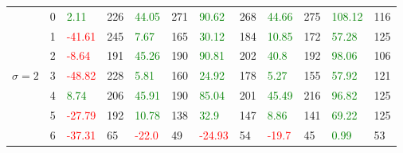 \begin{table}[!htb]
\begin{adjustwidth}{-0.8in}{-0.9in}
\begin{tabular}{|p{4em}|p{2em}|p{3em}|p{3em}|p{3em}|p{3em}|p{3em}|p{3em}|p{3em}|p{3em}|p{3em}|p{3em}|}
            & 0 & \textcolor{green}{2.11} & 226 & \textcolor{green}{44.05} & 271 & \textcolor{green}{90.62} & 268 & \textcolor{green}{44.66} & 275 & \textcolor{green}{108.12} & 116\\\cline{3-12}
            & 1 & \textcolor{red}{-41.61} & 245 & \textcolor{green}{7.67} & 165 & \textcolor{green}{30.12} & 184 & \textcolor{green}{10.85} & 172 & \textcolor{green}{57.28} & 125\\\cline{3-12}
            & 2 & \textcolor{red}{-8.64} & 191 & \textcolor{green}{45.26} & 190 & \textcolor{green}{90.81} & 202 & \textcolor{green}{40.8} & 192 & \textcolor{green}{98.06} & 106\\\cline{3-12}
            $\sigma=2$ & 3 & \textcolor{red}{-48.82} & 228 & \textcolor{green}{5.81} & 160 & \textcolor{green}{24.92} & 178 & \textcolor{green}{5.27} & 155 & \textcolor{green}{57.92} & 121\\\cline{3-12}
            & 4 & \textcolor{green}{8.74} & 206 & \textcolor{green}{45.91} & 190 & \textcolor{green}{85.04} & 201 & \textcolor{green}{45.49} & 216 & \textcolor{green}{96.82} & 125\\\cline{3-12}
            & 5 & \textcolor{red}{-27.79} & 192 & \textcolor{green}{10.78} & 138 & \textcolor{green}{32.9} & 147 & \textcolor{green}{8.86} & 141 & \textcolor{green}{69.22} & 125\\\cline{3-12}
            & 6 & \textcolor{red}{-37.31} & 65 & \textcolor{red}{-22.0} & 49 & \textcolor{red}{-24.93} & 54 & \textcolor{red}{-19.7} & 45 & \textcolor{green}{0.99} & 53\\\hline\hline
            

\end{tabular}
\end{adjustwidth}
\end{table}
